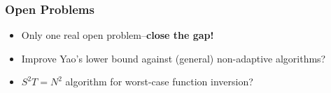 \documentclass[usenames, dvipsnames, t, table]{beamer}
\begin{document}



      \begin{frame}
        \frametitle{Open Problems}
        \begin{itemize}
        \item Only one real open problem--\pause\textbf{close the gap!}
          \pause
        \item Improve Yao's lower bound against (general) non-adaptive algorithms?
          \pause
        \item $S^2 T = N^2$ algorithm for worst-case function inversion?
        \end{itemize}
      \end{frame}
\end{document}
